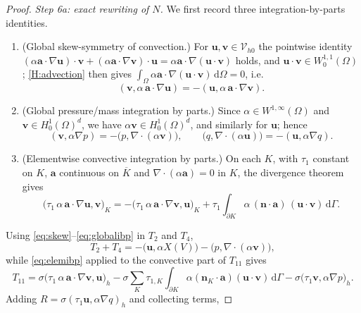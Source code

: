 \documentclass[11pt,a4paper]{article}
\newcommand{\bu}{\boldsymbol{u}}
\newcommand{\bv}{\boldsymbol{v}}
\newcommand{\ba}{\boldsymbol{a}}
\newcommand{\bn}{\boldsymbol{n}}
\newcommand{\X}{X}
\newcommand{\dd}{\,\mathrm{d}}
\theoremstyle{plain}
\theoremstyle{remark}
\theoremstyle{definition}
\numberwithin{equation}{section}
\begin{document}
\begin{proof}
\smallskip\noindent\emph{Step 6a: exact rewriting of $N$.}
We first record three integration-by-parts identities.
\begin{enumerate}[label=\textup{(\roman*)},leftmargin=2.6em]
\item (Global skew-symmetry of convection.) For $\bu,\bv\in\mathcal{V}_{h0}$ the
pointwise identity
$(\alpha\ba\cdot\nabla\bu)\cdot\bv+(\alpha\ba\cdot\nabla\bv)\cdot\bu
=\alpha\ba\cdot\nabla(\bu\cdot\bv)$ holds, and $\bu\cdot\bv\in W^{1,1}_0(\Omega)$;
\cref{H:advection} then gives $\int_\Omega\alpha\ba\cdot\nabla(\bu\cdot\bv)\dd\Omega=0$,
i.e.
\begin{equation}\label{eq:skew}
  (\bv,\alpha\,\ba\cdot\nabla\bu) = -(\bu,\alpha\,\ba\cdot\nabla\bv).
\end{equation}
\item (Global pressure/mass integration by parts.) Since
$\alpha\in W^{1,\infty}(\Omega)$ and $\bv\in H^1_0(\Omega)^d$, we have
$\alpha\bv\in H^1_0(\Omega)^d$, and similarly for $\bu$; hence
\begin{equation}\label{eq:globalibp}
  (\bv,\alpha\nabla p) = -\bigl(p,\nabla\cdot(\alpha\bv)\bigr),
  \qquad
  \bigl(q,\nabla\cdot(\alpha\bu)\bigr) = -(\bu,\alpha\nabla q).
\end{equation}
\item (Elementwise convective integration by parts.) On each $K$, with $\tau_1$ constant
on $K$, $\ba$ continuous on $\overline{K}$ and $\nabla\cdot(\alpha\ba)=0$ in $K$, the
divergence theorem gives
\begin{equation}\label{eq:elemibp}
  \bigl(\tau_1\,\alpha\,\ba\cdot\nabla\bu,\bv\bigr)_K
  = -\bigl(\tau_1\,\alpha\,\ba\cdot\nabla\bv,\bu\bigr)_K
  + \tau_{1}\int_{\partial K}\alpha\,(\bn\cdot\ba)\,(\bu\cdot\bv)\dd\Gamma .
\end{equation}
\end{enumerate}
Using \eqref{eq:skew}--\eqref{eq:globalibp} in $T_2$ and $T_4$,
\begin{equation*}
  T_2 + T_4 = -\bigl(\bu,\alpha\X(V)\bigr) - \bigl(p,\nabla\cdot(\alpha\bv)\bigr),
\end{equation*}
while \eqref{eq:elemibp} applied to the convective part of $T_{11}$ gives
\begin{equation*}
  T_{11}
  = \sigma\bigl(\tau_1\,\alpha\,\ba\cdot\nabla\bv,\bu\bigr)_h
  - \sigma\sum_{K}\tau_{1,K}\int_{\partial K}\alpha(\bn_K\cdot\ba)(\bu\cdot\bv)\dd\Gamma
  - \sigma\bigl(\tau_1\bv,\alpha\nabla p\bigr)_h .
\end{equation*}
Adding $R=\sigma(\tau_1\bu,\alpha\nabla q)_h$ and collecting terms,

\end{proof}
\end{document}
